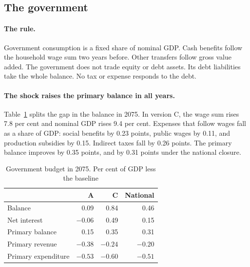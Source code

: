 \documentclass[11pt,a4paper]{article}
\begin{document}
\subsection{The government}

\paragraph{The rule.}
Government consumption is a fixed share of nominal GDP. Cash benefits follow the household wage sum two years before. Other transfers follow gross value added.
The government does not trade equity or debt assets. Its debt liabilities take the whole balance. No tax or expense responds to the debt.

\paragraph{The shock raises the primary balance in all years.}
Table~\ref{tab:budget} splits the gap in the balance in 2075.
In version C, the wage sum rises 7.8 per cent and nominal GDP rises 9.4 per cent.
Expenses that follow wages fall as a share of GDP: social benefits by 0.23 points, public wages by 0.11, and production subsidies by 0.15.
Indirect taxes fall by 0.26 points. The primary balance improves by 0.35 points, and by 0.31 points under the national closure.

\begin{table}[ht]
\centering
\small
\caption{Government budget in 2075. Per cent of GDP less the baseline}
\label{tab:budget}
\begin{tabular}{@{}lrrr@{}}
\toprule
 & A & C & National \\
\midrule
Balance & 0.09 & 0.84 & 0.46 \\
\quad Net interest & $-0.06$ & 0.49 & 0.15 \\
\quad Primary balance & 0.15 & 0.35 & 0.31 \\
\qquad Primary revenue & $-0.38$ & $-0.24$ & $-0.20$ \\
\qquad Primary expenditure & $-0.53$ & $-0.60$ & $-0.51$ \\
\bottomrule
\end{tabular}
\end{table}
\end{document}
